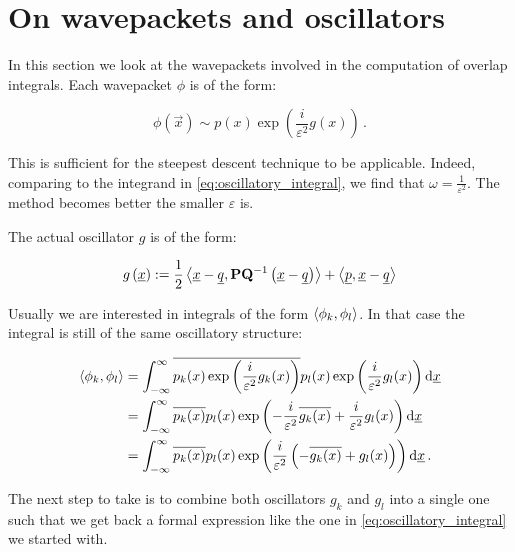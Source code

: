 \documentclass[a4paper,10pt]{article}
\begin{document}
\section{On wavepackets and oscillators}

In this section we look at the wavepackets involved in the computation
of overlap integrals. Each wavepacket $\phi$ is of the form:

\begin{equation}
  \phi(\vec{x}) \sim p(x)\exp\left(\frac{i}{\varepsilon^2} g(x)\right) \,.
\end{equation}

This is sufficient for the steepest descent technique to be applicable.
Indeed, comparing to the integrand in \eqref{eq:oscillatory_integral},
we find that $\omega = \frac{1}{\varepsilon^2}$. The method becomes
better the smaller $\varepsilon$ is.

The actual oscillator $g$ is of the form:

\begin{equation}
  g\left(\underline{x}\right)
  :=
  \frac{1}{2} \left\langle \underline{x}-\underline{q} , \mathbf{P}\mathbf{Q}{}^{-1} \left(\underline{x}-\underline{q}\right) \right\rangle
  +
  \left\langle \underline{p} , \underline{x}-\underline{q} \right\rangle
\end{equation}

Usually we are interested in integrals of the form $\left\langle \phi_k , \phi_l \right\rangle$.
In that case the integral is still of the same oscillatory structure:

\begin{equation}
\begin{split}
  \left\langle \phi_k , \phi_l \right\rangle & =
  \int_{-\infty}^{\infty} \overline{p_k(x)\exp\left(\frac{i}{\varepsilon^2} g_k(x)\right)}
                                p_l(x)\exp\left(\frac{i}{\varepsilon^2} g_l(x)\right)
  \mathrm{d}\underline{x} \\
  & =
  \int_{-\infty}^{\infty}
    \overline{p_k(x)} p_l(x)
    \exp\left(-\frac{i}{\varepsilon^2} \overline{g_k(x)} + \frac{i}{\varepsilon^2} g_l(x)\right)
  \mathrm{d}\underline{x} \\
  & =
  \int_{-\infty}^{\infty}
    \overline{p_k(x)} p_l(x)
    \exp\left(\frac{i}{\varepsilon^2}\left(-\overline{g_k(x)} + g_l(x)\right)\right)
  \mathrm{d}\underline{x} \,.
\end{split}
\end{equation}

The next step to take is to combine both oscillators $g_k$ and $g_l$ into a
single one such that we get back a formal expression like the one in
\eqref{eq:oscillatory_integral} we started with.
\end{document}
